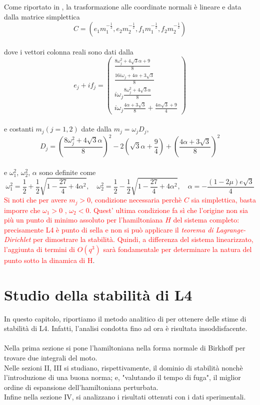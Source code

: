 \documentclass[a4paper,11pt,titlepage]{report}
\theoremstyle{definition}
\theoremstyle{plain}
\begin{document}
Come riportato in \cite{OTSA}, la trasformazione alle coordinate normali è lineare e data dalla matrice simplettica\\
$$ C = ( e_1m_1^{-\frac{1}{2}}, e_2m_2^{-\frac{1}{2}}, f_1m_1^{-\frac{1}{2}} , f_2m_2^{-\frac{1}{2}} ) $$
\\dove i vettori colonna reali sono dati dalla $$ e_j + if_j= \left( \begin{array}{llcl}
\frac{8 \omega_j^2 + 4 \sqrt{3} \alpha +9}{8} \\ \frac{16i \omega_j+4 \alpha +3 \sqrt{3}}{8} \\ i \omega_j \frac{8 \omega_j^2 + 4 \sqrt{3} \alpha}{8} \\ i \omega_j \frac{4 \alpha +3\sqrt{3}}{8} + \frac{4\alpha\sqrt{3}+9}{4}
\end{array}\right)$$
\\e costanti $m_j (j=1,2)$ date dalla $m_j=\omega_j D_j$, 
$$ D_j = ( \frac{8\omega_j^2 + 4 \sqrt{3}\alpha}{8})^2 - 2 (\sqrt{3}\alpha + \frac{9}{4} ) + (\frac{4\alpha+3\sqrt{3}}{8})^2$$ \\ e $\omega_1^2$, $\omega_2^2$, $\alpha$ sono definite come $$ \omega_1^2 = \frac{1}{2} + \frac{1}{2} \sqrt{1 - \frac{27}{4} + 4\alpha^2}, \quad  \omega_2^2 = \frac{1}{2} - \frac{1}{2} \sqrt{1 - \frac{27}{4} + 4\alpha^2}, \quad \alpha = - \frac{(1-2\mu)e\sqrt{3}}{4} $$
\textcolor{red}{Si noti che per avere $m_j > 0$, condizione necessaria perchè $C$ sia simplettica, basta imporre che $\omega_1 > 0$ , $\omega_2 < 0$. Quest' ultima condizione fa sì che l'origine non sia più un punto di minimo assoluto per l'hamiltoniana $H$ del sistema completo: precisamente L4 è punto di sella e non si può applicare il \textit{teorema di Lagrange-Dirichlet} per dimostrare la stabilità. Quindi, a differenza del sistema linearizzato, l'aggiunta di termini di $O(q^3)$ sarà fondamentale per determinare la natura del punto sotto la dinamica di H}.

\chapter{Studio della stabilità di L4}
In questo capitolo, riportiamo il metodo analitico di \cite{OTSA} per ottenere delle stime di stabilità di L4. Infatti,  l'analisi condotta fino ad ora è risultata insoddisfacente.
\\\\Nella prima sezione si pone l'hamiltoniana nella forma normale di Birkhoff per trovare due integrali del moto.
\\Nelle sezioni II, III si studiano, rispettivamente, il dominio di stabilità nonchè l'introduzione di una buona norma; e, "valutando il tempo di fuga", il miglior ordine di espansione dell'hamiltoniana perturbata.
\\Infine nella sezione IV, si analizzano i risultati ottenuti con i dati sperimentali. 
\end{document}
